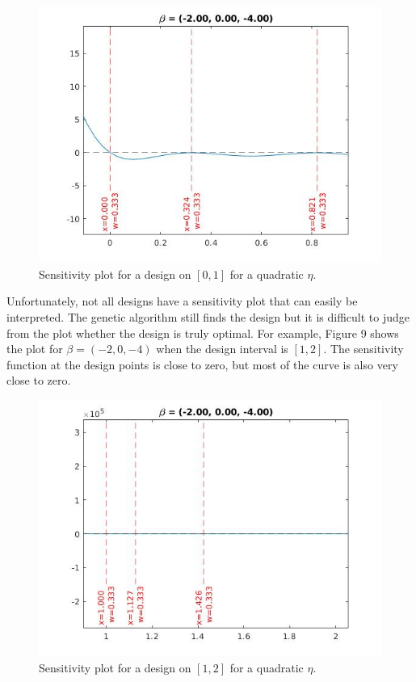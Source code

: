 \documentclass[11pt,a4paper]{article}
\begin{document}
\begin{figure}
\centering
\includegraphics[scale=0.5]{figures/3pt_2include.jpg}
\caption{Sensitivity plot for a design on $[0,1]$ for a quadratic $\eta$.}
\end{figure}

Unfortunately, not all designs have a sensitivity plot that can easily be interpreted. The genetic algorithm still finds the design but it is difficult to judge from the plot whether the design is truly optimal. For example, Figure 9 shows the plot for $\beta = (-2, 0, -4)$ when the design interval is $[1,2]$. The sensitivity function at the design points is close to zero, but most of the curve is also very close to zero.


\begin{figure}
\centering
\includegraphics[scale=0.5]{figures/3pt_noneend.jpg}
\caption{Sensitivity plot for a design on $[1,2]$ for a quadratic $\eta$.}
\end{figure}
\end{document}
